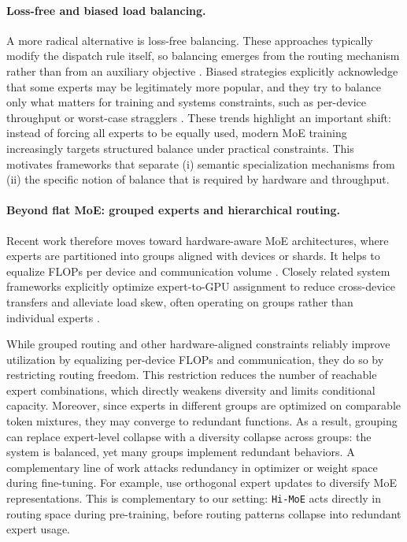 \documentclass[sigconf,nonacm]{acmart}
\begin{document}
\paragraph{Loss-free and biased load balancing.}
A more radical alternative is loss-free balancing. These approaches typically modify the dispatch rule itself, so balancing emerges from the routing mechanism rather than from an auxiliary objective \citep{lossfree, expertchoice}.
Biased strategies explicitly acknowledge that some experts may be legitimately more popular, and they try to balance only what matters for training and systems constraints, such as per-device throughput or worst-case stragglers \citep{megablocks, tutel}.
These trends highlight an important shift: instead of forcing all experts to be equally used, modern MoE training increasingly targets structured balance under practical constraints.
This motivates frameworks that separate (i) semantic specialization mechanisms from (ii) the specific notion of balance that is required by hardware and throughput.

\paragraph{Beyond flat MoE: grouped experts and hierarchical routing.}
Recent work therefore moves toward hardware-aware MoE architectures, where experts are partitioned into groups aligned with devices or shards.
It helps to equalize FLOPs per device and communication volume \citep{gracemoe, moetuner, moge}.
Closely related system frameworks explicitly optimize expert-to-GPU assignment to reduce cross-device transfers and alleviate load skew, often operating on groups rather than individual experts \citep{fastmoe, fastermoe, comet, tutel}.

While grouped routing and other hardware-aligned constraints reliably improve utilization by equalizing per-device FLOPs and communication, they do so by restricting routing freedom.
This restriction reduces the number of reachable expert combinations, which directly weakens diversity and limits conditional capacity.
Moreover, since experts in different groups are optimized on comparable token mixtures, they may converge to redundant functions.
As a result, grouping can replace expert-level collapse with a diversity collapse across groups: the system is balanced, yet many groups implement redundant behaviors.
A complementary line of work attacks redundancy in optimizer or weight space during fine-tuning.
For example, \citet{liu2024diversifying} use orthogonal expert updates to diversify MoE representations.
This is complementary to our setting: \texttt{Hi-MoE} acts directly in routing space during pre-training, before routing patterns collapse into redundant expert usage.
\end{document}
